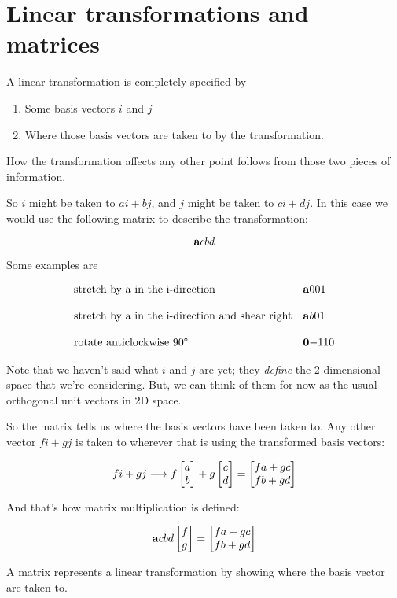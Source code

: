 \section{Linear transformations and matrices}

A linear transformation is completely specified by

\begin{enumerate}
\item Some basis vectors $i$ and $j$
\item Where those basis vectors are taken to by the transformation.
\end{enumerate}

How the transformation affects any other point follows from those two pieces of
information.

So $i$ might be taken to $ai + bj$, and $j$ might be taken to $ci + dj$.
In this case we would use the following matrix to describe the
transformation:

$$
\mathbf{a}{c}
    {b}{d}
$$

Some examples are

$$
\begin{array}{ll}
\text{stretch by a in the i-direction} & \mathbf{a}{0}
                                             {0}{1}
\\\\
\text{stretch by a in the i-direction and shear right} & \mathbf{a}{b}
                                                             {0}{1}
\\\\
\text{rotate anticlockwise 90°} & \mathbf{0}{-1}
                                      {1}{ 0}
\end{array}
$$

Note that we haven't said what $i$ and $j$ are yet; they \textit{define} the
2-dimensional space that we're considering. But, we can think of them for now
as the usual orthogonal unit vectors in 2D space.

So the matrix tells us where the basis vectors have been taken to. Any other
vector $fi + gj$ is taken to wherever that is using the transformed basis
vectors:

$$
fi + gj \longrightarrow f\begin{bmatrix}a\\b\end{bmatrix} + g\begin{bmatrix}c\\d\end{bmatrix} = \begin{bmatrix}fa + gc\\fb + gd\end{bmatrix}
$$


And that's how matrix multiplication is defined:

$$
\mathbf{a}{c}
    {b}{d} \begin{bmatrix}f\\g\end{bmatrix} = \begin{bmatrix}fa + gc\\fb + gd\end{bmatrix}
$$


A matrix represents a linear transformation by showing where the basis vector
are taken to.

